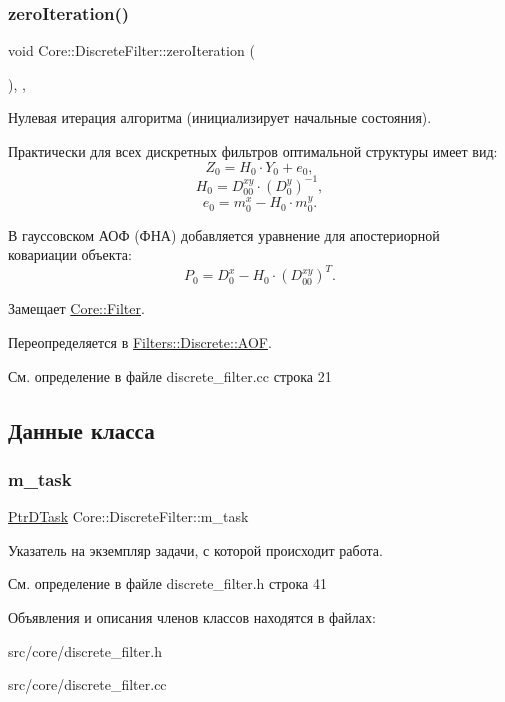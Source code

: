 \subsubsection{\texorpdfstring{zero\+Iteration()}{zeroIteration()}}
{\footnotesize\ttfamily void Core\+::\+Discrete\+Filter\+::zero\+Iteration (\begin{DoxyParamCaption}{ }\end{DoxyParamCaption})\hspace{0.3cm}{\ttfamily [override]}, {\ttfamily [protected]}, {\ttfamily [virtual]}}



Нулевая итерация алгоритма (инициализирует начальные состояния). 

Практически для всех дискретных фильтров оптимальной структуры имеет вид\+: \[Z_0 = H_0 \cdot Y_0 + e_0,\] \[H_0 = D_{00}^{xy} \cdot (D_0^y)^{-1},\] \[e_0 = m_0^x - H_0 \cdot m_0^y.\]

В гауссовском АОФ (ФНА) добавляется уравнение для апостериорной ковариации объекта\+: \[P_0 = D_0^x - H_0 \cdot (D_{00}^{xy})^T.\] 

Замещает \hyperlink{class_core_1_1_filter_af95880b734c4b8dc3d8c02f222b32506}{Core\+::\+Filter}.



Переопределяется в \hyperlink{class_filters_1_1_discrete_1_1_a_o_f_aa822fe74d7ca160f898db1c1289e17f7}{Filters\+::\+Discrete\+::\+A\+OF}.



См. определение в файле discrete\+\_\+filter.\+cc строка 21



\subsection{Данные класса}
\hypertarget{class_core_1_1_discrete_filter_a6a2d67be8eaa0df383fe080474975faa}{}\label{class_core_1_1_discrete_filter_a6a2d67be8eaa0df383fe080474975faa} 
\subsubsection{\texorpdfstring{m\+\_\+task}{m\_task}}
{\footnotesize\ttfamily \hyperlink{namespace_core_a9cd3f9b81303651b8d115031018f0ebf}{Ptr\+D\+Task} Core\+::\+Discrete\+Filter\+::m\+\_\+task\hspace{0.3cm}{\ttfamily [protected]}}

Указатель на экземпляр задачи, с которой происходит работа. 

См. определение в файле discrete\+\_\+filter.\+h строка 41



Объявления и описания членов классов находятся в файлах\+:\begin{DoxyCompactItemize}
\item 
src/core/discrete\+\_\+filter.\+h\item 
src/core/discrete\+\_\+filter.\+cc\end{DoxyCompactItemize}
